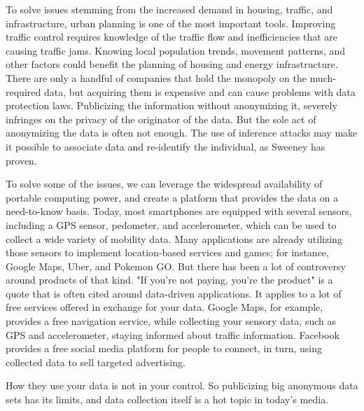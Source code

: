 To solve issues stemming from the increased demand in housing, traffic, and infrastructure, urban planning is one of the most important tools. Improving traffic control requires knowledge of the traffic flow and inefficiencies that are causing traffic jams. Knowing local population trends, movement patterns, and other factors could benefit the planning of housing and energy infrastructure. There are only a handful of companies that hold the monopoly on the much-required data, but acquiring them is expensive and can cause problems with data protection laws. Publicizing the information without anonymizing it, severely infringes on the privacy of the originator of the data. But the sole act of anonymizing the data is often not enough. The use of inference attacks may make it possible to associate data and re-identify the individual, as Sweeney has proven.

To solve some of the issues, we can leverage the widespread availability of portable computing power, and create a platform that provides the data on a need-to-know basis. Today, most smartphones are equipped with several sensors, including a GPS sensor, pedometer, and accelerometer, which can be used to collect a wide variety of mobility data. Many applications are already utilizing those sensors to implement location-based services and games; for instance, Google Maps, Uber, and Pokemon GO. But there has been a lot of controversy around products of that kind. "If you're not paying, you're the product" is a quote that is often cited around data-driven applications.
It applies to a lot of free services offered in exchange for your data. Google Maps, for example, provides a free navigation service, while collecting your sensory data, such as GPS and accelerometer, staying informed about traffic information. Facebook provides a free social media platform for people to connect, in turn, using collected data to sell targeted advertising.

How they use your data is not in your control. So publicizing big anonymous data sets has its limits, and data collection itself is a hot topic in today's media. 

